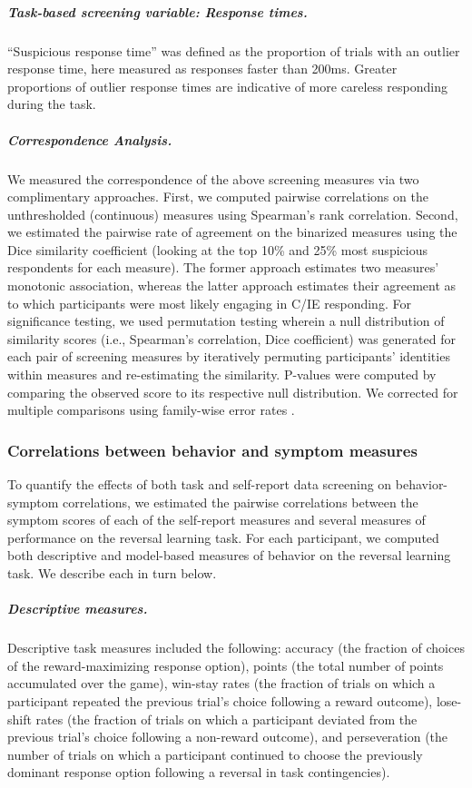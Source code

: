 \documentclass[a4paper,notitlepage,12pt]{article}
\begin{document}
\subparagraph{Task-based screening variable: Response times.} ``Suspicious response time'' was defined as the proportion of trials with an outlier response time, here measured as responses faster than 200ms. Greater proportions of outlier response times are indicative of more careless responding during the task.

\subparagraph{Correspondence Analysis.} We measured the correspondence of the above screening measures via two complimentary approaches. First, we computed pairwise correlations on the unthresholded (continuous) measures using Spearman's rank correlation. Second, we estimated the pairwise rate of agreement on the binarized measures using the Dice similarity coefficient (looking at the top 10\% and 25\% most suspicious respondents for each measure). The former approach estimates two measures' monotonic association, whereas the latter approach estimates their agreement as to which participants were most likely engaging in C/IE responding. For significance testing, we used permutation testing wherein a null distribution of similarity scores (i.e., Spearman's correlation, Dice coefficient) was generated for each pair of screening measures by iteratively permuting participants' identities within measures and re-estimating the similarity. P-values were computed by comparing the observed score to its respective null distribution. We corrected for multiple comparisons using family-wise error rates \cite{winkler2014permutation}.

\subsubsection*{Correlations between behavior and symptom measures}

To quantify the effects of both task and self-report data screening on behavior-symptom correlations, we estimated the pairwise correlations between the symptom scores of each of the self-report measures and several measures of performance on the reversal learning task. For each participant, we computed both descriptive and model-based measures of behavior on the reversal learning task. We describe each in turn below.

\subparagraph{Descriptive measures.} Descriptive task measures included the following: accuracy (the fraction of choices of the reward-maximizing response option), points (the total number of points accumulated over the game), win-stay rates (the fraction of trials on which a participant repeated the previous trial's choice following a reward outcome), lose-shift rates (the fraction of trials on which a participant deviated from the previous trial's choice following a non-reward outcome), and perseveration (the number of trials on which a participant continued to choose the previously dominant response option following a reversal in task contingencies).
\end{document}
